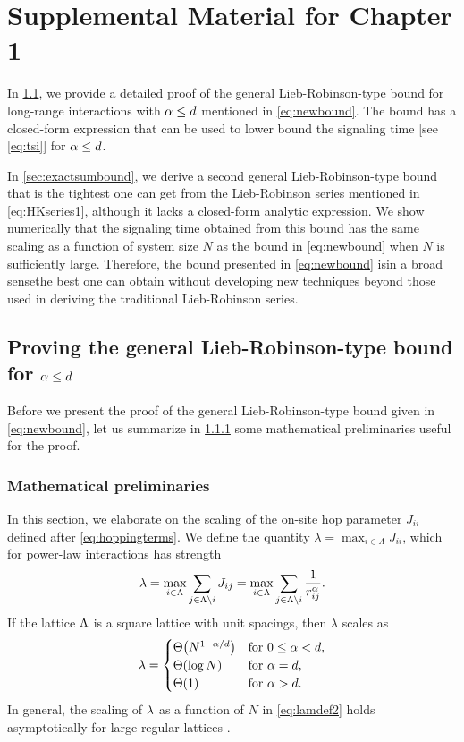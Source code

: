 \chapter{Supplemental Material for Chapter 1}

In \cref{sec:generalbound}, we provide a detailed proof of the general Lieb-Robinson-type bound for long-range interactions with $\alpha\le d$ mentioned in \cref{eq:newbound}. The bound has a closed-form expression that can be used to lower bound the signaling time [see \cref{eq:tsi}] for $\alpha \le d$.

In \cref{sec:exactsumbound}, we derive a second general Lieb-Robinson-type bound that is the tightest one can get from the Lieb-Robinson series mentioned in \cref{eq:HKseries1}, although it lacks a closed-form analytic expression.
We show numerically that the signaling time obtained from this bound has the same scaling as a function of system size $N$ as the bound in \cref{eq:newbound} when $N$ is sufficiently large.
Therefore, the bound presented in \cref{eq:newbound} is\dash in a broad sense\dash the best one can obtain without developing new techniques beyond those used in deriving the traditional Lieb-Robinson series.

\section{Proving the general Lieb-Robinson-type bound for \texorpdfstring{$\alpha \le d$}{α <= d}}
\label{sec:generalbound}
Before we present the proof of the general Lieb-Robinson-type bound given in \cref{eq:newbound}, let us summarize in \cref{sec:math} some mathematical preliminaries useful for the proof.

\subsection{Mathematical preliminaries}
\label{sec:math}
In this section, we elaborate on the scaling of the on-site hop parameter $J_{ii}$ defined after \cref{eq:hoppingterms}.
We define the quantity $\lambda = \max_{i\in\Lambda} J_{ii}$, which for power-law interactions has strength
\begin{equation}
	\label{eq:self-hop}
	\lambda = \max_{i\in\Lambda} \sum_{j\in\Lambda\backslash i} J_{ij} = \max_{i\in\Lambda}\sum_{j\in\Lambda\backslash i} \frac{1}{r_{ij}^{\alpha}}.
\end{equation}
If the lattice $\Lambda$ is a square lattice with unit spacings, then $\lambda$ scales as
\begin{equation}
        \label{eq:lamdef2}
	\lam = \begin{cases}
        \Th{N^{1-\al/d}} & \text{for }0\le\al<d,\\
        \Th{\log N} & \text{for }\al=d,\\
        \Th 1 & \text{for }\al>d.
\end{cases}
\end{equation}
In general, the scaling of $\lambda$ as a function of $N$ in \cref{eq:lamdef2} holds asymptotically for large regular lattices \cite{Storch15}.

